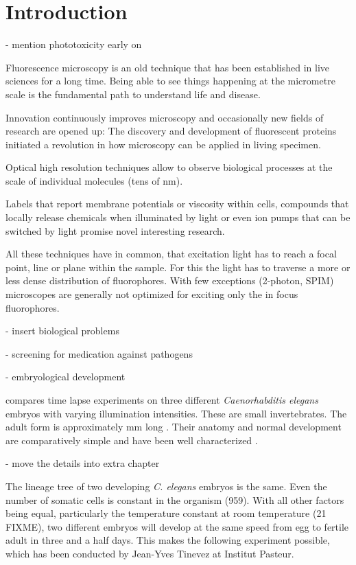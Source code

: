 \chapter{Introduction}
\label{sec:intro}

- mention phototoxicity early on

Fluorescence microscopy is an old technique that has been established    
in live sciences for a long time. Being able to see things happening
at the micrometre scale is the fundamental path to understand life and
disease.

Innovation continuously improves microscopy and occasionally new        
fields of research are opened up: The discovery and development of
fluorescent proteins initiated a revolution in how microscopy can be
applied in living specimen. 

Optical high resolution techniques allow to observe biological          
processes at the scale of individual molecules (tens of nm).

Labels that report membrane potentials or viscosity within cells,       
compounds that locally release chemicals when illuminated by light or
even ion pumps that can be switched by light promise novel interesting
research.

All these techniques have in common, that excitation light has to       
reach a focal point, line or plane within the sample. For this the
light has to traverse a more or less dense distribution of
fluorophores.  With few exceptions (2-photon, SPIM) microscopes are
generally not optimized for exciting only the in focus fluorophores.

- insert biological problems

- screening for medication against pathogens

- embryological development

 compares time lapse experiments on three    
different \emph{Caenorhabditis elegans} embryos with varying
illumination intensities. These are small invertebrates. The adult
form is approximately \unit[1]{mm} long . Their anatomy and normal
development are comparatively simple and have been well characterized
\citep{Durbin1987}.

- move the details into extra chapter

The lineage tree of two developing \emph{C. elegans} embryos is the     
same.  Even the number of somatic cells is constant in the organism
(959). With all other factors being equal, particularly the
temperature constant at room temperature (21 FIXME), two different
embryos will develop at the same speed from egg to fertile adult in
three and a half days. This makes the following experiment possible,
which has been conducted by Jean-Yves Tinevez at Institut Pasteur.


